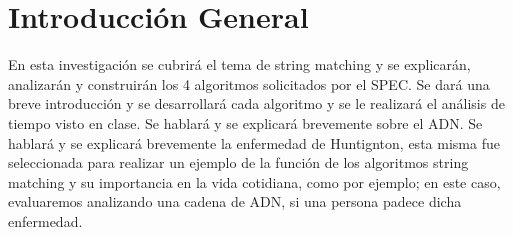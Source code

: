 \part*{Introducción General}

\quad En esta investigación se cubrirá el tema de string matching y se explicarán, analizarán y construirán los 4 algoritmos solicitados por el SPEC. Se dará una breve introducción y se desarrollará cada algoritmo y se le realizará el análisis de tiempo visto en clase. Se hablará y se explicará brevemente sobre el ADN. Se hablará y se explicará brevemente la enfermedad de Huntignton, esta misma fue seleccionada para realizar un ejemplo de la función de los algoritmos string matching y su importancia en la vida cotidiana, como por ejemplo; en este caso, evaluaremos analizando una cadena de ADN, si una persona padece dicha enfermedad.